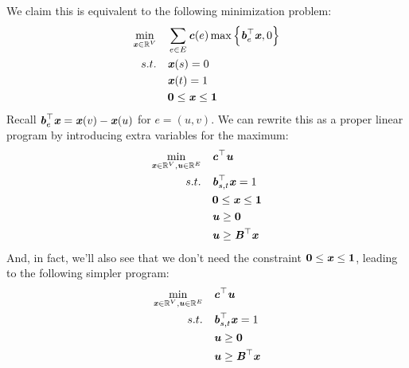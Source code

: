 We claim this is equivalent to the following
minimization problem:
\begin{align}
  \begin{aligned}
    \min_{\xx \in \R^{V}} \quad &\sum_{e\in E} \cc(e) \max\left\{\bb_e^\trp \xx, 0\right\} \\
    s.t. \quad & \xx(s) = 0 \\
    & \xx(t) = 1 \\
    &\veczero\leq \xx\leq \vecone \\
  \end{aligned}
  \label{prog1}
\end{align}
Recall $\boldsymbol{\mathit{b}}_e^\top \boldsymbol{\mathit{x}} = \boldsymbol{\mathit{x}}(v) - \boldsymbol{\mathit{x}}(u)$ for $e = (u, v)$.
We can rewrite this as a proper linear program by
introducing extra variables for the maximum:
\begin{align}
  \begin{aligned}
    \min_{\xx \in \R^{V}, \uu \in \R^{E}} \quad & \cc^\trp \uu \\
    s.t. \quad & \bb_{s,t}^\trp\xx = 1 \\
    &\veczero\leq \xx\leq \vecone \\
    &\uu \geq \veczero \\
    &\uu \geq \BB^\trp \xx \\
  \end{aligned}
  \label{prog2}
\end{align}
And, in fact, we'll also see that we don't need the constraint
$\boldsymbol{0}\leq \boldsymbol{\mathit{x}}\leq \boldsymbol{1}$, leading to the following simpler
program:
\begin{align}
  \begin{aligned}
    \min_{\xx \in \R^{V}, \uu \in \R^{E}} \quad & \cc^\trp \uu \\
    s.t. \quad & \bb_{s,t}^\trp\xx = 1 \\
    &\uu \geq \veczero \\
    &\uu \geq \BB^\trp \xx \\
  \end{aligned}
  \label{prog3}
\end{align}


